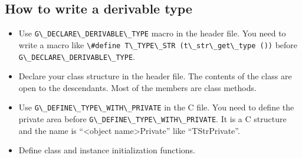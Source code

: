 \subsection{How to write a derivable
type}\label{how-to-write-a-derivable-type}

\begin{itemize}
\tightlist
\item
  Use \passthrough{\lstinline!G\_DECLARE\_DERIVABLE\_TYPE!} macro in the
  header file. You need to write a macro like
  \passthrough{\lstinline!\#define T\_TYPE\_STR (t\_str\_get\_type ())!}
  before \passthrough{\lstinline!G\_DECLARE\_DERIVABLE\_TYPE!}.
\item
  Declare your class structure in the header file. The contents of the
  class are open to the descendants. Most of the members are class
  methods.
\item
  Use \passthrough{\lstinline!G\_DEFINE\_TYPE\_WITH\_PRIVATE!} in the C
  file. You need to define the private area before
  \passthrough{\lstinline!G\_DEFINE\_TYPE\_WITH\_PRIVATE!}. It is a C
  structure and the name is ``\textless object
  name\textgreater Private'' like ``TStrPrivate''.
\item
  Define class and instance initialization functions.
\end{itemize}
